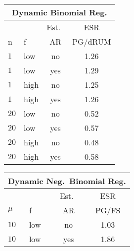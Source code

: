 \documentclass[12pt]{article}
\begin{document}
\begin{table}
\small
\centering 

\begin{tabular}{l l c c}
\multicolumn{4}{c}{Dynamic Binomial Reg.} \\
\hline
& & Est.\ & ESR \\
n & f & AR & PG/dRUM \\
\hline
$1$ & low & no & 1.26 \\
$1$ & low & yes & 1.29 \\

$1$ & high & no & 1.25 \\
$1$ & high & yes & 1.26 \\

$20$ & low & no & 0.52 \\
$20$ & low & yes & 0.57 \\

$20$ & high & no & 0.48 \\
$20$ & high & yes & 0.58 
\end{tabular}
%
\hspace{12pt}
%
\begin{tabular}{l l c c}
\multicolumn{4}{c}{Dynamic Neg.\ Binomial Reg.} \\
\hline
& & Est.\ & ESR \\
$\mu$ & f & AR & PG/FS \\
\hline
$10$ & low & no & 1.03 \\
$10$ & low & yes & 1.86 \\


\end{tabular}
\end{table}
\end{document}
